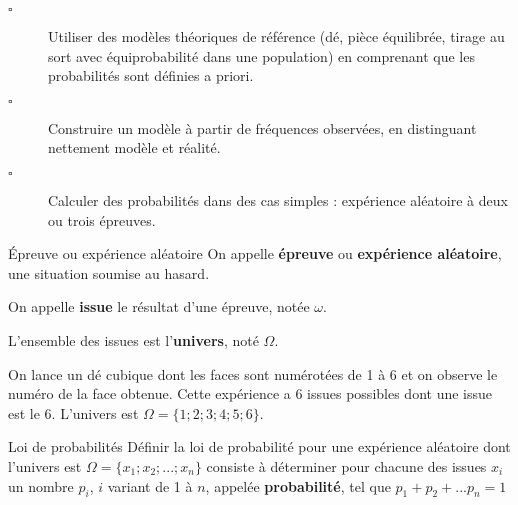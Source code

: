 \begin{titre}[Probabilités]

\end{titre}


\begin{CpsCol}
\begin{description}
\item[$\square$] Utiliser des modèles théoriques de référence (dé, pièce équilibrée, tirage au sort avec
équiprobabilité dans une population) en comprenant que les probabilités sont définies
a priori.
\item[$\square$] Construire un modèle à partir de fréquences observées, en distinguant nettement
modèle et réalité.
\item[$\square$] Calculer des probabilités dans des cas simples : expérience aléatoire à deux ou trois
épreuves.
\end{description}
\end{CpsCol}


\begin{DefT}{Épreuve ou expérience aléatoire}
On appelle \textbf{épreuve} ou \textbf{expérience aléatoire}, une situation soumise au hasard.

On appelle \textbf{issue} le résultat d'une épreuve, notée $\omega$. 

L'ensemble des issues est l'\textbf{univers}, noté $\Omega$. 
\end{DefT}

\begin{Ex}
On lance un dé cubique dont les faces sont numérotées de 1 à 6 et on observe le numéro de la face obtenue. Cette expérience a 6 issues possibles dont une issue est le 6. L'univers est $\Omega = \lbrace 1;2;3;4;5;6 \rbrace$.
\end{Ex}





\begin{DefT}{Loi de probabilités}
Définir la loi de probabilité pour une expérience aléatoire dont l'univers est $\Omega = \lbrace x_1; x_2; ... ; x_n \rbrace$ consiste à déterminer pour chacune des issues $x_i$ un nombre $p_i$, $i$ variant de 1 à $n$, appelée \textbf{probabilité}, tel que $p_1+p_2+...p_n=1$
\end{DefT}

